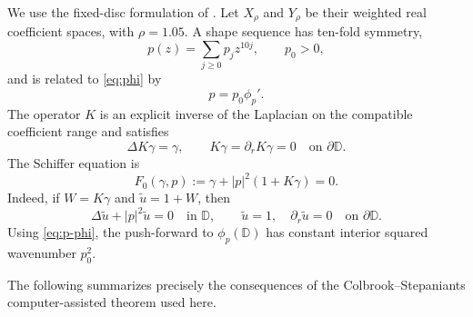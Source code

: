 \documentclass[11pt]{amsart}
\newcommand{\D}{\mathbb D}
\newcommand{\abs}[1]{\left\lvert #1\right\rvert}
\begin{document}
We use the fixed-disc formulation of
\cite{ColbrookStepaniants2026}.  Let $X_\rho$ and $Y_\rho$ be their weighted
real coefficient spaces, with $\rho=1.05$.  A shape sequence has ten-fold
symmetry,
\begin{equation}\label{eq:p}
  p(z)=\sum_{j\ge0}p_jz^{10j},
  \qquad p_0>0,
\end{equation}
and is related to \eqref{eq:phi} by
\begin{equation}\label{eq:p-phi}
  p=p_0\phi_p'.
\end{equation}
The operator $K$ is an explicit inverse of the Laplacian on the compatible
coefficient range and satisfies
\begin{equation}\label{eq:K}
  \Delta K\gamma=\gamma,
  \qquad
  K\gamma=\partial_rK\gamma=0
  \quad\text{on }\partial\D.
\end{equation}
The Schiffer equation is
\begin{equation}\label{eq:F0}
  F_0(\gamma,p)
  :=\gamma+\abs{p}^2(1+K\gamma)=0.
\end{equation}
Indeed, if $W=K\gamma$ and $\widetilde u=1+W$, then
\[
  \Delta\widetilde u+\abs p^2\widetilde u=0
  \quad\text{in }\D,
  \qquad
  \widetilde u=1,
  \quad
  \partial_r\widetilde u=0
  \quad\text{on }\partial\D.
\]
Using \eqref{eq:p-phi}, the push-forward to $\phi_p(\D)$ has constant
interior squared wavenumber $p_0^2$.

The following summarizes precisely the consequences of the
Colbrook--Stepaniants computer-assisted theorem used here.
\end{document}

